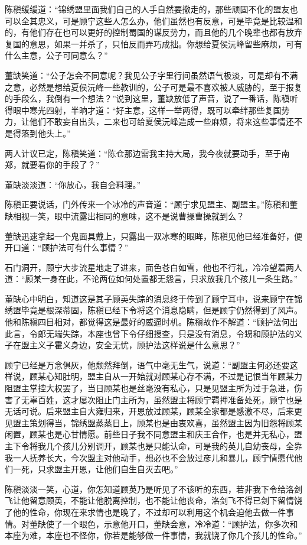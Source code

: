 陈稹缓缓道：“锦绣盟里面我们自己的人手自然要撤走的，那些顽固不化的盟友也可以全其忠义，可是顾宁这些人怎么办，他们虽然也有反意，可是毕竟是比较温和的，有他们存在也可以更好的控制蜀国的谋反势力，而且他的几个晚辈也都有放弃复国的意思，如果一并杀了，只怕反而弄巧成拙。你想给夏侯沅峰留些麻烦，可有什么主意，公子可同意么？”

董缺笑道：“公子怎会不同意呢？我见公子字里行间虽然语气极淡，可是却有不满之意，必然是想给夏侯沅峰一些教训的，公子可是最不喜欢被人威胁的，至于报复的手段么，我倒有一个想法？”说到这里，董缺放低了声音，说了一番话，陈稹听得眼中寒光四射，半晌才道：“好主意，这样一举两得，既可以牵绊那些复国势力，让他们不敢妄自出头，二来也可给夏侯沅峰造成一些麻烦，将来这些事情还不是得落到他头上。”

两人计议已定，陈稹笑道：“陈仓那边需我主持大局，我今夜就要动手，至于南郑，就要看你的手段了？”

董缺淡淡道：“你放心，我自会料理。”

陈稹正要说话，门外传来一个冰冷的声音道：“顾宁求见盟主、副盟主。”陈稹和董缺相视一笑，眼中流露出相同的意味，这不是说曹操曹操就到么？

董缺迅速拿起一个鬼面具戴上，只露出一双冰寒的眼眸，陈稹见他已经准备好，便开口道：“顾护法可有什么事情？”

石门洞开，顾宁大步流星地走了进来，面色苍白如雪，他也不行礼，冷冷望着两人道：“顾某一身在此，不论两位如何处置都无怨言，只求放我几个孩儿一条生路。”

董缺心中明白，知道这是其子顾英失踪的消息终于传到了顾宁耳中，说来顾宁在锦绣盟毕竟是根深蒂固，陈稹已经下令将这个消息隐瞒，但是顾宁仍然得到了风声。他和陈稹四目相对，都觉得这是最好的威逼时机。陈稹故作不解道：“顾护法何出此言，令郎无端失踪，本座也曾下令仔细搜查，只是没有消息，令甥和顾护法的义子在盟主义子霍义身边，安全无忧，顾护法这样说是什么意思？”

顾宁已经是万念俱灰，他颓然拜倒，语气中毫无生气，说道：“副盟主何必还要这样说，顾某心知肚明，盟主自从一开始就对顾某心存不满，不过是记恨当年顾某力阻盟主掌控大权罢了，当日顾某也是丝毫没有私心，只是见盟主所为过于急进，伤害了无辜百姓，这才屡次阻止门主所为，虽然盟主将顾宁羁押准备处死，顾宁也是无话可说。后来盟主自大雍归来，开恩放过顾某，顾某全家都是感激不尽，后来更见盟主策划得当，锦绣盟蒸蒸日上，顾某也是由衷欢喜，虽然盟主因为旧怨将顾某闲置，顾某也是心甘情愿。前些日子我不同意盟主和庆王合作，也是并无私心，盟主下令将我几个孩儿分别调开，顾某也是只能认命，可是我的英儿自幼丧母，全靠我一人抚养长大，今次盟主对他动手，想必也不会放过彦儿和暴儿，顾宁情愿代他们一死，只求盟主开恩，让他们自生自灭去吧。”

陈稹淡淡一笑，心道，你怎知道顾英乃是听见了不该听的东西，若非我下令给洛剑飞让他留意顾英，不能让他脱离控制，也不能让他丧命，洛剑飞不得已剑下留情饶了他的性命，你现在来求情也是晚了，不过却可以利用这个机会迫他去做一件事情。对董缺使了一个眼色，示意他开口，董缺会意，冷冷道：“顾护法，你多次和本座为难，本座也不怪你，你若是能够做一件事情，我就饶了你几个孩儿的性命。”

